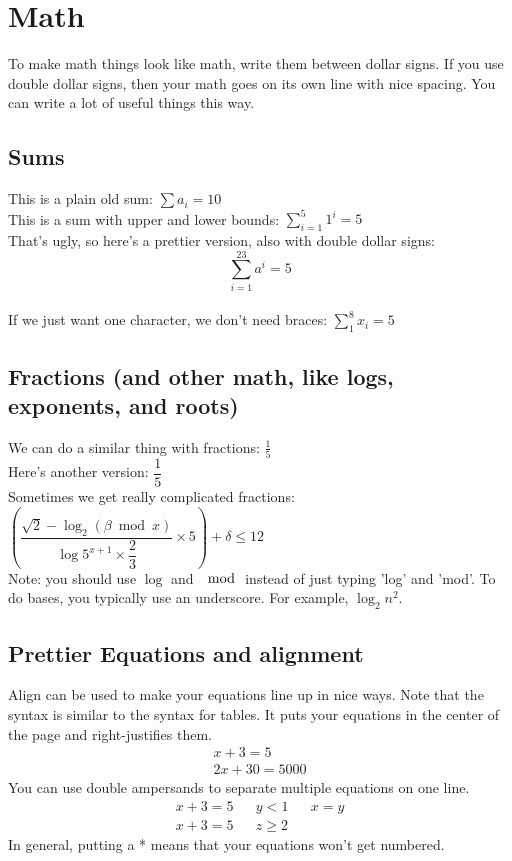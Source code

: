 \documentclass[11pt]{article}			%
\begin{document}
\section{Math}
To make math things look like math, write them between dollar signs.  If you use double dollar signs, then your math goes on its own line with nice spacing.  You can write a lot of useful things this way.\\

\subsection{Sums}
This is a plain old sum: $\sum a_i = 10$\\
This is a sum with upper and lower bounds: $\sum_{i = 1}^{5} 1^i = 5$\\
That's ugly, so here's a prettier version, also with double dollar signs:
 $$\displaystyle \sum_{i = 1}^{23} a^i = 5$$\\
If we just want one character, we don't need braces: $\displaystyle \sum_1^8 x_i = 5$\\

\subsection{Fractions (and other math, like logs, exponents, and roots)}
We can do a similar thing with fractions: $\frac{1}{5}$\\
Here's another version: $\dfrac{1}{5}$\\
Sometimes we get really complicated fractions: $(\dfrac{\sqrt{2} - \log_2 (\beta \bmod x)}{\log 5^{x + 1} \times \dfrac{2}{3}} \times 5) + \delta \leq 12$\\
Note: you should use $\log$ and $\mod$ instead of just typing 'log' and 'mod'. To do bases, you typically use an underscore. For example, $\log_{2} n^2$.
\subsection{Prettier Equations and alignment}
Align can be used to make your equations line up in nice ways.  Note that the syntax is similar to the syntax for tables.  It puts your equations in the center of the page and right-justifies them.
\begin{align*}
 x + 3 = 5 \\
 2x + 30 = 5000
\end{align*}
You can use double ampersands to separate multiple equations on one line.
\begin{align}
 x + 3 = 5 && y < 1 && x = y \\
 x + 3 = 5 && z \ge 2
\end{align}
In general, putting a * means that your equations won't get numbered.
\end{document}
